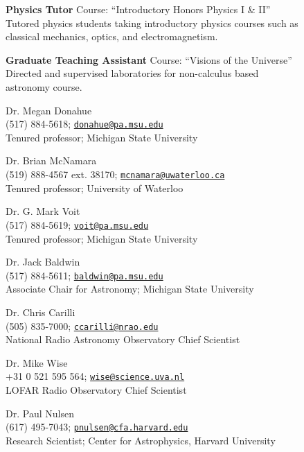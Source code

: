 \documentclass[12pt]{cv}
\begin{document}
\begin{llist}
{\sc \bf{Physics Tutor}}
Course: ``Introductory Honors Physics I \& II''\\
Tutored physics students taking introductory physics courses such as\\
classical mechanics, optics, and electromagnetism.

{\sc \bf{Graduate Teaching Assistant}}
Course: ``Visions of the Universe''\\
Directed and supervised laboratories for non-calculus based\\
astronomy course.




{\sc Dr. Megan Donahue}\\
(517) 884-5618; \href{mailto:donahue@pa.msu.edu}{\tt donahue@pa.msu.edu}\\
Tenured professor; Michigan State University

{\sc Dr. Brian McNamara}\\
(519) 888-4567 ext. 38170; \href{mailto:mcnamara@uwaterloo.ca}{\tt mcnamara@uwaterloo.ca}\\
Tenured professor; University of Waterloo

{\sc Dr. G. Mark Voit}\\
 (517) 884-5619; \href{mailto:voit@pa.msu.edu}{\tt voit@pa.msu.edu}\\
Tenured professor; Michigan State University

{\sc Dr. Jack Baldwin}\\
 (517) 884-5611; \href{mailto:baldwin@pa.msu.edu}{\tt baldwin@pa.msu.edu}\\
Associate Chair for Astronomy; Michigan State University

{\sc Dr. Chris Carilli}\\
(505) 835-7000; \href{mailto:ccarilli@nrao.edu}{\tt ccarilli@nrao.edu}\\
National Radio Astronomy Observatory Chief Scientist

{\sc Dr. Mike Wise}\\
+31 0 521 595 564; \href{mailto:wise@science.uva.nl}{\tt wise@science.uva.nl}\\
LOFAR Radio Observatory Chief Scientist

{\sc Dr. Paul Nulsen}\\
(617) 495-7043; \href{mailto:pnulsen@cfa.harvard.edu}{\tt pnulsen@cfa.harvard.edu}\\
Research Scientist; Center for Astrophysics, Harvard University


\end{llist}
\end{document}
